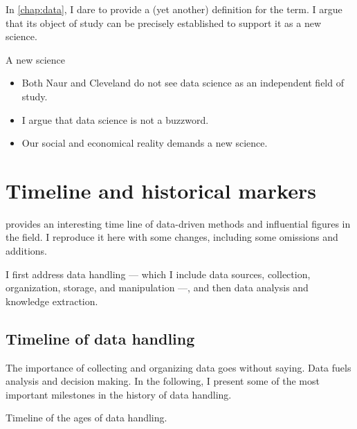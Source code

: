 In \cref{chap:data}, I dare to provide a (yet another) definition for the term.  I
argue that its object of study can be precisely established to support it as a new
science.

\begin{mainbox}{A new science}
  \begin{itemize}
    \item Both Naur and Cleveland do not see data science as an independent field of study.
    \item I argue that data science is not a buzzword.
    \item Our social and economical reality demands a new science.
  \end{itemize}
\end{mainbox}

\section{Timeline and historical markers}

\textcite{Kelleher2018} provides an interesting time line of data-driven methods and
influential figures in the field.  I reproduce it here with some changes, including
some omissions and additions.

I first address data handling --- which I include data sources, collection, organization,
storage, and manipulation ---, and then data analysis and knowledge extraction.

\subsection{Timeline of data handling}

The importance of collecting and organizing data goes without saying.  Data fuels analysis and
decision making.  In the following, I present some of the most important milestones in the history
of data handling.

\begin{figurebox}[label=fig:data-handling-history]{Timeline of the ages of data handling.}
  \centering
\end{figurebox}

